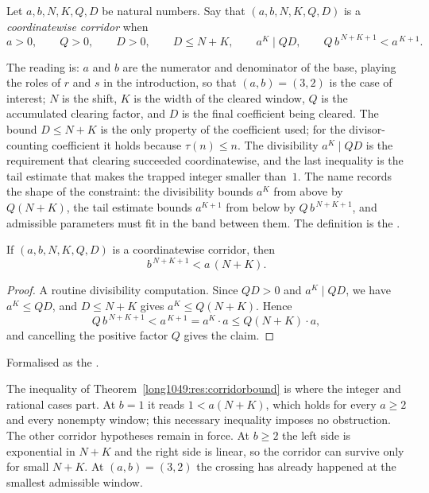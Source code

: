 \begin{definition}\label{long1049:def:corridor}
Let $a,b,N,K,Q,D$ be natural numbers.  Say that $(a,b,N,K,Q,D)$ is a
\emph{coordinatewise corridor} when
\[
 a>0,\qquad Q>0,\qquad D>0,\qquad D\le N+K,\qquad
 a^{K}\mid QD,\qquad Q\,b^{\,N+K+1}<a^{\,K+1}.
\]
\end{definition}

\noindent The reading is: $a$ and $b$ are the numerator and denominator of the
base, playing the roles of $r$ and $s$ in the introduction, so that
$(a,b)=(3,2)$ is the case of interest;
$N$ is the shift, $K$ is the width of the cleared window, $Q$ is the
accumulated clearing factor, and $D$ is the final coefficient being cleared.
The bound $D\le N+K$ is the only property of the coefficient used; for the
divisor-counting coefficient it holds because $\tau(n)\le n$.  The divisibility
$a^{K}\mid QD$ is the requirement that clearing succeeded coordinatewise, and
the last inequality is the tail estimate that makes the trapped integer smaller
than~$1$.  The name records the shape of the constraint: the divisibility
bounds $a^{K}$ from above by $Q(N+K)$, the tail estimate bounds $a^{K+1}$ from
below by $Q\,b^{\,N+K+1}$, and admissible parameters must fit in the band
between them.  The definition is the
.

\begin{theorem}\label{long1049:res:corridorbound}
If $(a,b,N,K,Q,D)$ is a coordinatewise corridor, then
\[
 b^{\,N+K+1}<a\,(N+K).
\]
\end{theorem}

\begin{proof}
A routine divisibility computation.  Since $QD>0$ and $a^{K}\mid QD$, we have
$a^{K}\le QD$, and $D\le N+K$ gives
$a^{K}\le Q(N+K)$.  Hence
\[
 Q\,b^{\,N+K+1}<a^{\,K+1}=a^{K}\cdot a\le Q(N+K)\cdot a,
\]
and cancelling the positive factor $Q$ gives the claim.
\end{proof}

\noindent Formalised as the
.

The inequality of Theorem~\ref{long1049:res:corridorbound} is where the integer and
rational cases part.  At $b=1$ it reads $1<a(N+K)$, which holds for every
$a\ge2$ and every nonempty window; this necessary inequality imposes no
obstruction.  The other corridor hypotheses remain in force.
At $b\ge2$ the left side is exponential in $N+K$ and the right side is linear,
so the corridor can survive only for small $N+K$.  At $(a,b)=(3,2)$ the
crossing has already happened at the smallest admissible window.

